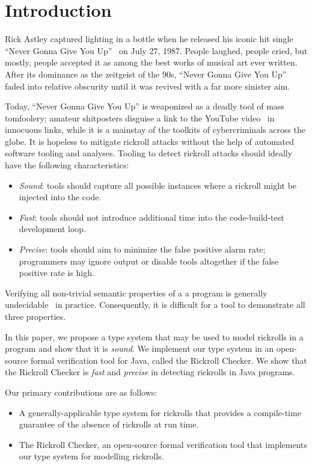 \section{Introduction}
\label{sec:intro}

Rick Astley captured lighting in a bottle when he released his iconic hit
single ``Never Gonna Give You Up''~\cite{NeverGonnaGiveYouUpWiki} on July 27,
1987.
People laughed, people cried, but mostly, people accepted it as among the best
works of musical art ever written.
After its dominance as the zeitgeist of the 90s, ``Never Gonna Give You Up''
faded into relative obscurity until it was revived with a far more sinister
aim.

Today, ``Never Gonna Give You Up'' is weaponized as a deadly tool of mass
tomfoolery; amateur shitposters disguise a link to the YouTube
video~\cite{NeverGonnaGiveYouUpYouTube} in innocuous links, while it is a
mainstay of the toolkits of cybercriminals across the globe.
It is hopeless to mitigate rickroll attacks without the help of automated
software tooling and analyses.
Tooling to detect rickroll attacks should ideally have the following
characteristics:

\begin{itemize}
  \item \textit{Sound}: tools should capture all possible
    instances where a rickroll might be injected into the code.
  \item \textit{Fast}: tools should not introduce additional
    time into the code-build-test development loop.
  \item \textit{Precise}: tools should aim to minimize the false positive
    alarm rate; programmers may ignore output or disable tools altogether
    if the false positive rate is high.
\end{itemize}

\noindent Verifying all non-trivial semantic properties of a a program is
generally undecidable~\cite{Rice53} in practice.
Consequently, it is difficult for a tool to demonstrate all three properties.

In this paper, we propose a type system that may be used to model rickrolls
in a program and show that it is \textit{sound}.
We implement our type system in an open-source formal verification tool for
Java, called the Rickroll Checker.
We show that the Rickroll Checker is \textit{fast} and \textit{precise} in
detecting rickrolls in Java programs.

Our primary contributions are as follows:

\begin{itemize}
  \item A generally-applicable type system for rickrolls that
    provides a compile-time guarantee of the absence of rickrolls at run time.
  \item The Rickroll Checker, an open-source formal verification tool that
    implements our type system for modelling rickrolls.
\end{itemize}

